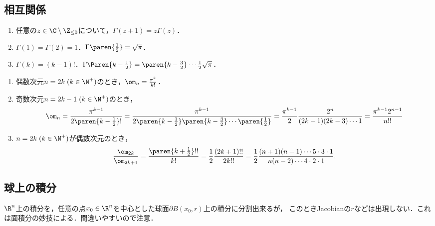 \documentclass[uplatex,dvipdfmx]{jsreport}
\begin{document}
\subsection{相互関係}

\begin{lemma}[Gamma関数の性質]\mbox{}
    \begin{enumerate}
        \item 任意の$z\in\C\setminus\Z_{\le0}$について，$\Gamma(z+1)=z\Gamma(z)$．
        \item $\Gamma(1)=\Gamma(2)=1$．$\Gamma\paren{\frac{1}{2}}=\sqrt{\pi}$．
        \item $\Gamma(k)=(k-1)!$．$\Gamma\Paren{k-\frac{1}{2}}=\paren{k-\frac{3}{2}}\cdots\frac{1}{2}\sqrt{\pi}$．
    \end{enumerate}
\end{lemma}


\begin{corollary}\mbox{}\label{cor-volume-of-ball-in-odd-and-even-dimension}
    \begin{enumerate}
        \item 偶数次元$n=2k\;(k\in\N^+)$のとき，$\om_n=\frac{\pi^k}{k!}$．
        \item 奇数次元$n=2k-1\;(k\in\N^+)$のとき，
        \[\om_n=\frac{\pi^{k-1}}{2\paren{k-\frac{1}{2}}!}=\frac{\pi^{k-1}}{2\paren{k-\frac{1}{2}}\paren{k-\frac{3}{2}}\cdots\paren{\frac{1}{2}}}=\frac{\pi^{k-1}}{2}\frac{2^n}{(2k-1)(2k-3)\cdots 1}=\frac{\pi^{k-1}2^{n-1}}{n!!}\]
        \item $n=2k\;(k\in\N^+)$が偶数次元のとき，
        \[\frac{\om_{2k}}{\om_{2k+1}}=\frac{\paren{k+\frac{1}{2}}!!}{k!}=\frac{1}{2}\frac{(2k+1)!!}{2k!!}=\frac{1}{2}\frac{(n+1)(n-1)\cdots5\cdot3\cdot1}{n(n-2)\cdots4\cdot2\cdot1}.\]
    \end{enumerate}
\end{corollary}

\subsection{球上の積分}

\begin{tcolorbox}[colframe=ForestGreen, colback=ForestGreen!10!white,breakable,colbacktitle=ForestGreen!40!white,coltitle=black,fonttitle=\bfseries\sffamily,
title=]
    $\R^n$上の積分を，任意の点$x_0\in\R^n$を中心とした球面$\partial B(x_0,r)$上の積分に分割出来るが，
    このときJacobianの$r$などは出現しない．これは面積分の妙技による．間違いやすいので注意．
\end{tcolorbox}
\end{document}
